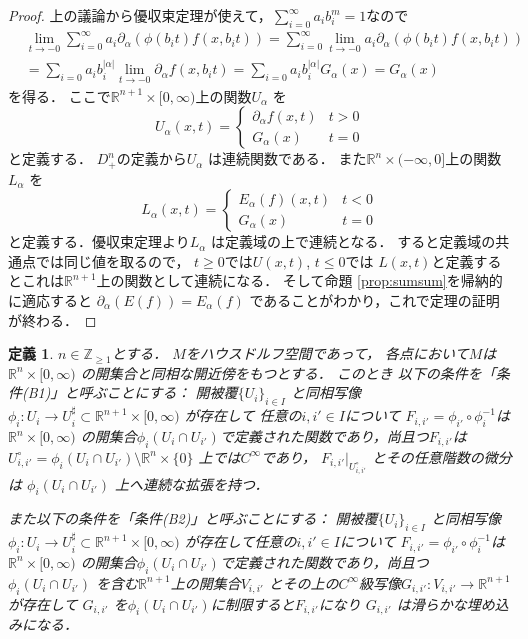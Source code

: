 \documentclass[leqno, a4paper, 12pt]{jsarticle}
\newtheorem{df}[thm]{定義}
\newcommand{\zz}{\mathbb{Z}}
\newcommand{\rr}{\mathbb{R}}
\begin{document}
\begin{proof}
上の議論から優収束定理が使えて，$\sum_{i=0}^{\infty}a_{i}b_{i}^{m}=1$なので
\begin{align*}
&\lim_{t\to-0}\sum_{i=0}^{\infty}a_{i}
\partial_{\alpha}(\phi(b_{i}t)f(x, b_{i}t))
=\sum_{i=0}^{\infty}\lim_{t\to -0}
a_{i}
\partial_{\alpha}(\phi(b_{i}t)f(x, b_{i}t))\\
&=\sum_{i=0}a_{i}b_{i}^{|\alpha|}\lim_{t\to -0}\partial_{\alpha}f(x, b_{i}t)
=\sum_{i=0}a_{i}b_{i}^{|\alpha|}G_{\alpha}(x)
=G_{\alpha}(x)
\end{align*}
を得る．
ここで$\rr^{n+1}\times [0, \infty)$上の関数$U_{\alpha}$
を
\[
U_{\alpha}(x, t)=
\begin{cases}
\partial_{\alpha}f(x, t) & \text{$t>0$}\\
G_{\alpha}(x) & \text{$t=0$}
\end{cases}
\]
と定義する．
$D_{+}^{n}$の定義から$U_{\alpha}$
は連続関数である．
また$\rr^{n}\times (-\infty, 0]$上の関数$L_{\alpha}$
を
\[
L_{\alpha}(x, t)
=
\begin{cases}
E_{\alpha}(f)(x, t) & \text{$t<0$}\\
G_{\alpha}(x) & \text{$t=0$}
\end{cases}
\]
と定義する．優収束定理より$L_{\alpha}$
は定義域の上で連続となる．
すると定義域の共通点では同じ値を取るので，
$t\ge 0$では$U(x, t)$, $t\le 0$では
$L(x, t)$と定義するとこれは$\rr^{n+1}$上の関数として連続になる．
そして命題 \ref{prop:sumsum}を帰納的に適応すると
$\partial_{\alpha}(E(f))=E_{\alpha}(f)$
であることがわかり，これで定理の証明が終わる．
\end{proof}

\begin{df}
$n\in \zz_{\ge 1}$とする．
$M$をハウスドルフ空間であって，
各点において$M$は$\rr^{n}\times [0, \infty)$
の開集合と同相な開近傍をもつとする．
このとき
以下の条件を「条件(B1)」と呼ぶことにする：
開被覆$\{U_{i}\}_{i\in I}$
と同相写像
$\phi_{i}\colon U_{i}\to U_{i}^{\sharp}
\subset \rr^{n+1}\times [0, \infty)$
が存在して
任意の$i, i'\in I$について
$F_{i, i'}=\phi_{i'}\circ \phi_{i}^{-1}$は$\rr^{n}\times [0, \infty)$
の開集合$\phi_{i}(U_{i}\cap U_{i'})$で定義された関数であり，尚且つ$F_{i, i'}$は
$U_{i, i'}^{\circ}=\phi_{i}(U_{i}\cap U_{i'})\setminus \rr^{n}\times \{0\}$
上では$C^{\infty}$であり，
$F_{i, i'}|_{U_{i, i'}^{\circ}}$
とその任意階数の微分は
$\phi_{i}(U_{i}\cap U_{i'})$
上へ連続な拡張を持つ．

また以下の条件を「条件(B2)」と呼ぶことにする：
開被覆$\{U_{i}\}_{i\in I}$
と同相写像
$\phi_{i}\colon U_{i}\to U_{i}^{\sharp}\subset 
\rr^{n+1}\times [0, \infty)$
が存在して任意の$i, i'\in I$について
$F_{i, i'}=\phi_{i'}\circ \phi_{i}^{-1}$は$\rr^{n}\times [0, \infty)$
の開集合$\phi_{i}(U_{i}\cap U_{i'})$で定義された関数であり，尚且つ
$\phi_{i}(U_{i}\cap U_{i'})$
を含む$\rr^{n+1}$上の開集合$V_{i, i'}$
とその上の$C^{\infty}$級写像$G_{i, i'}:V_{i, i'}\to \rr^{n+1}$が存在して
$G_{i, i'}$
を$\phi_{i}(U_{i}\cap U_{i'})$に制限すると$F_{i, i'}$になり
$G_{i, i'}$
は滑らかな埋め込みになる．
\end{df}
\end{document}
